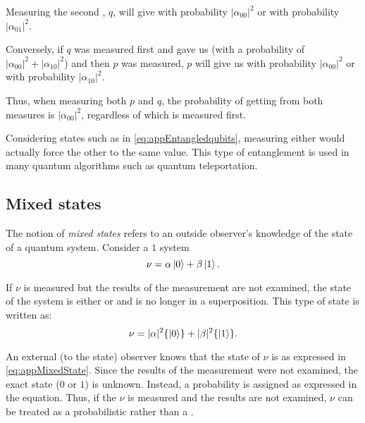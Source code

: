 Measuring the second \qubit{}, $q$, will give  with
probability $|\alpha_{00}|^2$ or 
with probability $|\alpha_{01}|^2$.

Conversely, if  $q$ was measured first and gave us 
(with a probability of $|\alpha_{00}|^2 + |\alpha_{10}|^2$)
and then $p$ was measured, $p$ will give us  with probability
$|\alpha_{00}|^2$ or  with probability $|\alpha_{10}|^2$.

Thus, when measuring both $p$ and $q$, the probability of getting 
from both measures is $|\alpha_{00}|^2$, regardless of which \qubit{}
is measured first.

Considering states such as in \ref{eq:appEntangledqubits},
measuring either \qubit{} would actually force the other \qubit{} to the
same value. This type of entanglement is used in
many quantum algorithms such as
quantum teleportation.


\subsection{Mixed states} %
\label{sub:mixed_states}


The notion of \emph{mixed states} refers to an outside observer's knowledge of
the state of a quantum system. Consider a $1$ \qubit{} system
\begin{equation}
\nu = \alpha\left\vert{0}\right\rangle + \beta\left\vert{1}\right\rangle.\label{eq:appOnequbitSystem}
\end{equation}

If $\nu$ is measured but the results of the measurement are not examined,
 the state of the system is either  or
 and is no longer in a superposition. This type of state
is written as:
\begin{equation}
\nu = |\alpha|^2\{\left\vert{0}\right\rangle\} + |\beta|^2\{\left\vert{1}\right\rangle\}.\label{eq:appMixedState}
\end{equation}

An external (to the state) observer knows that the state
of $\nu$ is as expressed in
\vref{eq:appMixedState}. Since the results of the measurement
were not examined, the exact state ($0$ or $1$) is unknown.
Instead, a probability is assigned  as expressed in the equation.
Thus, if the \qubit{} $\nu$ is measured and the results are not
examined, $\nu$ can be treated as a probabilistic \bit{} rather
than a  \qubit.



